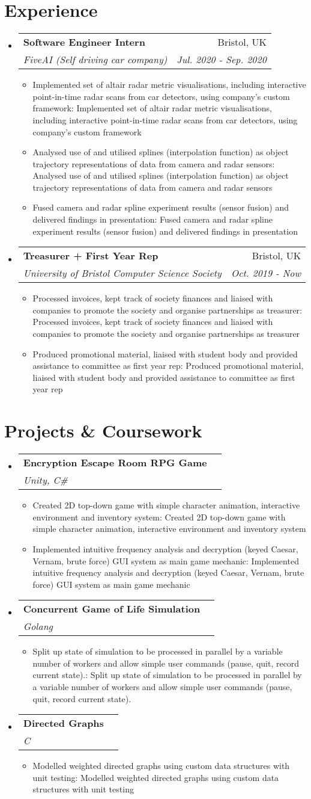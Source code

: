 \documentclass[a4paper,11pt]{article}
\makeatletter
\def \ifempty#1{\def\temp{#1} \ifx\temp\empty }
\newcommand{\resumeItem}[2]{
  \item\small{
  	\ifempty{#1}#2\else\textbf{#1}{: #2 \vspace{-2pt}}\fi
  }
}
\newcommand{\resumeSubheading}[4]{
  \vspace{-1pt}\item
    \begin{tabular*}{0.97\textwidth}{l@{\extracolsep{\fill}}r}
      \textbf{#1} & #2 \\
      \textit{\small#3} & \textit{\small #4} \\
    \end{tabular*}\vspace{-5pt}
}
\newcommand{\resumeSubHeadingListStart}{\begin{itemize}[leftmargin=*]}
\newcommand{\resumeSubHeadingListEnd}{\end{itemize}}
\newcommand{\resumeItemListStart}{\begin{itemize}}
\newcommand{\resumeItemListEnd}{\end{itemize}\vspace{-5pt}}
\makeatother
\begin{document}
\section{Experience}
  \resumeSubHeadingListStart
    \resumeSubheading
      {Software Engineer Intern}{Bristol, UK}
      {FiveAI (Self driving car company)}{Jul. 2020 - Sep. 2020}
      \resumeItemListStart
      	\resumeItem{}
          {Implemented set of altair radar metric visualisations, including interactive point-in-time radar scans from car detectors, using company's custom framework}
      	\resumeItem{}
          {Analysed use of and utilised splines (interpolation function) as object trajectory representations of data from camera and radar sensors}
        \resumeItem{}
          {Fused camera and radar spline experiment results (sensor fusion) and delivered findings in presentation}
        \resumeItemListEnd
      
    \resumeSubheading
      {Treasurer + First Year Rep}{Bristol, UK}
      {University of Bristol Computer Science Society}{Oct. 2019 - Now}
      \resumeItemListStart
      	\resumeItem{}
          {Processed invoices, kept track of society finances and liaised with companies to promote the society and organise partnerships as treasurer}
        \resumeItem{}
          {Produced promotional material, liaised with student body and provided assistance to committee as first year rep}
      \resumeItemListEnd
     
    
  \resumeSubHeadingListEnd


\section{Projects \& Coursework}
  \resumeSubHeadingListStart
    \resumeSubheading
      {Encryption Escape Room RPG Game}{}
      {Unity, C\#}{}
      \resumeItemListStart
        \resumeItem{}
          {Created 2D top-down game with simple character animation, interactive environment and inventory system}
        \resumeItem{}
          {Implemented intuitive frequency analysis and decryption (keyed Caesar, Vernam, brute force) GUI system as main game mechanic}
      \resumeItemListEnd
    \resumeSubheading
      {Concurrent Game of Life Simulation}{}
      {Golang}{}
      \resumeItemListStart
        \resumeItem{}
          {Split up state of simulation to be processed in parallel by a variable number of workers and allow simple user commands (pause, quit, record current state).}
      \resumeItemListEnd
    \resumeSubheading
      {Directed Graphs}{}
      {C}{}
      \resumeItemListStart
        \resumeItem{}
          {Modelled weighted directed graphs using custom data structures with unit testing}
      \resumeItemListEnd
  \resumeSubHeadingListEnd
\end{document}
